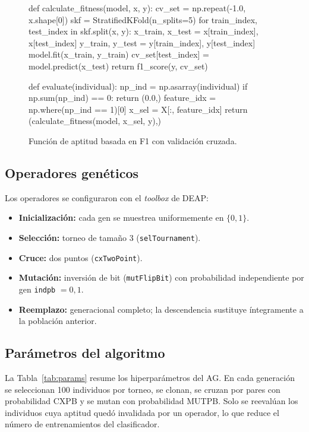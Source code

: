 \documentclass[conference]{IEEEtran}
\begin{document}
\begin{figure}[htbp]
\begin{code}
def calculate_fitness(model, x, y):
    cv_set = np.repeat(-1.0, x.shape[0])
    skf = StratifiedKFold(n_splits=5)
    for train_index, test_index in skf.split(x, y):
        x_train, x_test = x[train_index], x[test_index]
        y_train, y_test = y[train_index], y[test_index]
        model.fit(x_train, y_train)
        cv_set[test_index] = model.predict(x_test)
    return f1_score(y, cv_set)

def evaluate(individual):
    np_ind = np.asarray(individual)
    if np.sum(np_ind) == 0:
        return (0.0,)
    feature_idx = np.where(np_ind == 1)[0]
    x_sel = X[:, feature_idx]
    return (calculate_fitness(model, x_sel, y),)
\end{code}
\caption{Función de aptitud basada en F1 con validación cruzada.}
\label{lst:fitness}
\end{figure}

\subsection{Operadores genéticos}
Los operadores se configuraron con el \emph{toolbox} de DEAP:
\begin{itemize}
  \item \textbf{Inicialización:} cada gen se muestrea uniformemente en $\{0,1\}$.
  \item \textbf{Selección:} torneo de tamaño 3 (\texttt{selTournament}).
  \item \textbf{Cruce:} dos puntos (\texttt{cxTwoPoint}).
  \item \textbf{Mutación:} inversión de bit (\texttt{mutFlipBit}) con probabilidad independiente por gen \texttt{indpb} $= 0{,}1$.
  \item \textbf{Reemplazo:} generacional completo; la descendencia sustituye íntegramente a la población anterior.
\end{itemize}

\subsection{Parámetros del algoritmo}
La Tabla~\ref{tab:params} resume los hiperparámetros del AG. En cada generación se seleccionan 100 individuos por torneo, se clonan, se cruzan por pares con probabilidad CXPB y se mutan con probabilidad MUTPB. Solo se reevalúan los individuos cuya aptitud quedó invalidada por un operador, lo que reduce el número de entrenamientos del clasificador.
\end{document}
